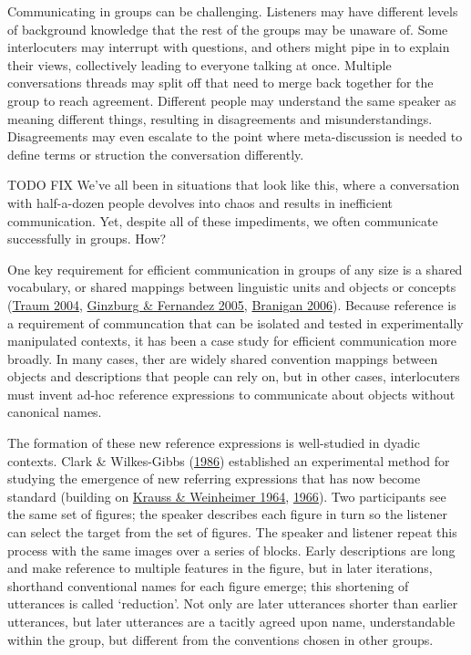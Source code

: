\documentclass[
  english,
  a4paper,
]{article}
\begin{document}
Communicating in groups can be challenging. Listeners may have different levels of background knowledge that the rest of the groups may be unaware of. Some interlocuters may interrupt with questions, and others might pipe in to explain their views, collectively leading to everyone talking at once. Multiple conversations threads may split off that need to merge back together for the group to reach agreement. Different people may understand the same speaker as meaning different things, resulting in disagreements and misunderstandings. Disagreements may even escalate to the point where meta-discussion is needed to define terms or struction the conversation differently.

TODO FIX We've all been in situations that look like this, where a conversation with half-a-dozen people devolves into chaos and results in inefficient communication. Yet, despite all of these impediments, we often communicate successfully in groups. How?

One key requirement for efficient communication in groups of any size is a shared vocabulary, or shared mappings between linguistic units and objects or concepts (\protect\hyperlink{ref-traum2004}{Traum 2004}, \protect\hyperlink{ref-ginzburg2005}{Ginzburg \& Fernandez 2005}, \protect\hyperlink{ref-branigan2006}{Branigan 2006}). Because reference is a requirement of communcation that can be isolated and tested in experimentally manipulated contexts, it has been a case study for efficient communication more broadly. In many cases, ther are widely shared convention mappings between objects and descriptions that people can rely on, but in other cases, interlocuters must invent ad-hoc reference expressions to communicate about objects without canonical names.

The formation of these new reference expressions is well-studied in dyadic contexts. Clark \& Wilkes-Gibbs (\protect\hyperlink{ref-clarkReferringCollaborativeProcess1986}{1986}) established an experimental method for studying the emergence of new referring expressions that has now become standard (building on \protect\hyperlink{ref-kraussChangesReferencePhrases1964}{Krauss \& Weinheimer 1964}, \protect\hyperlink{ref-kraussConcurrentFeedbackConfirmation1966}{1966}). Two participants see the same set of figures; the speaker describes each figure in turn so the listener can select the target from the set of figures. The speaker and listener repeat this process with the same images over a series of blocks. Early descriptions are long and make reference to multiple features in the figure, but in later iterations, shorthand conventional names for each figure emerge; this shortening of utterances is called `reduction'. Not only are later utterances shorter than earlier utterances, but later utterances are a tacitly agreed upon name, understandable within the group, but different from the conventions chosen in other groups.
\end{document}
